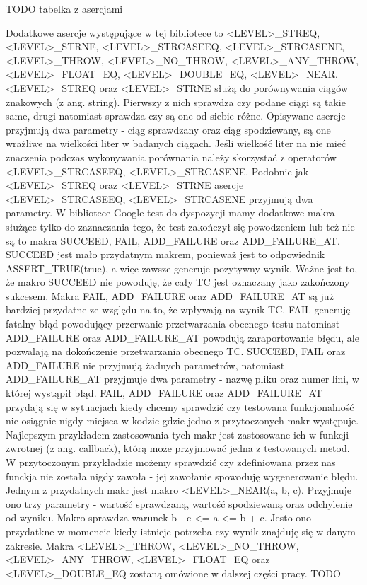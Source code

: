 TODO tabelka z asercjami

Dodatkowe asercje występujące w tej bibliotece to <LEVEL>_STREQ, <LEVEL>_STRNE, <LEVEL>_STRCASEEQ, <LEVEL>_STRCASENE, <LEVEL>_THROW, <LEVEL>_NO_THROW, <LEVEL>_ANY_THROW, <LEVEL>_FLOAT_EQ, <LEVEL>_DOUBLE_EQ, <LEVEL>_NEAR.
<LEVEL>_STREQ oraz <LEVEL>_STRNE służą do porównywania ciągów znakowych (z ang. string). Pierwszy z nich sprawdza czy podane ciągi są takie same, drugi natomiast sprawdza czy są one od siebie różne. Opisywane asercje przyjmują dwa parametry - ciąg sprawdzany oraz ciąg spodziewany, są one wrażliwe na wielkości liter w badanych ciągach. Jeśli wielkość liter na nie mieć znaczenia podczas wykonywania porównania należy skorzystać z operatorów 
<LEVEL>_STRCASEEQ, <LEVEL>_STRCASENE. Podobnie jak <LEVEL>_STREQ oraz <LEVEL>_STRNE asercje <LEVEL>_STRCASEEQ, <LEVEL>_STRCASENE przyjmują dwa parametry.
W bibliotece Google test do dyspozycji mamy dodatkowe makra służące tylko do zaznaczania tego, że test zakończył się powodzeniem lub też nie - są to makra SUCCEED, FAIL, ADD_FAILURE oraz ADD_FAILURE_AT.
SUCCEED jest mało przydatnym makrem, ponieważ jest to odpowiednik ASSERT_TRUE(true), a więc zawsze generuje pozytywny wynik. Ważne jest to, że makro SUCCEED nie powoduję, że cały TC jest oznaczany jako zakończony sukcesem.
Makra FAIL, ADD_FAILURE oraz ADD_FAILURE_AT są już bardziej przydatne ze względu na to, że wpływają na wynik TC. FAIL generuję fatalny błąd powodujący przerwanie przetwarzania obecnego testu natomiast ADD_FAILURE oraz ADD_FAILURE_AT powodują zaraportowanie błędu, ale pozwalają na dokończenie przetwarzania obecnego TC.
SUCCEED, FAIL oraz ADD_FAILURE nie przyjmują żadnych parametrów, natomiast ADD_FAILURE_AT przyjmuje dwa parametry - nazwę pliku oraz numer lini, w której wystąpił błąd.
FAIL, ADD_FAILURE oraz ADD_FAILURE_AT przydają się w sytuacjach kiedy chcemy sprawdzić czy testowana funkcjonalność nie osiągnie nigdy miejsca w kodzie gdzie jedno z przytoczonych makr występuje. Najlepszym przykładem zastosowania tych makr jest zastosowane ich w funkcji zwrotnej (z ang. callback), którą może przyjmować jedna z testowanych metod. W przytoczonym przykładzie możemy sprawdzić czy zdefiniowana przez nas funckja nie została nigdy zawoła - jej zawołanie spowoduję wygenerowanie błędu.
Jednym z przydatnych makr jest makro <LEVEL>_NEAR(a, b, c). Przyjmuje ono trzy parametry - wartość sprawdzaną, wartość spodziewaną oraz odchylenie od wyniku. Makro sprawdza warunek b - c <= a <= b + c. Jesto ono przydatkne w momencie kiedy istnieje potrzeba czy wynik znajduję się w danym zakresie.
Makra <LEVEL>_THROW, <LEVEL>_NO_THROW, <LEVEL>_ANY_THROW, <LEVEL>_FLOAT_EQ oraz <LEVEL>_DOUBLE_EQ zostaną omówione w dalszej części pracy. TODO

